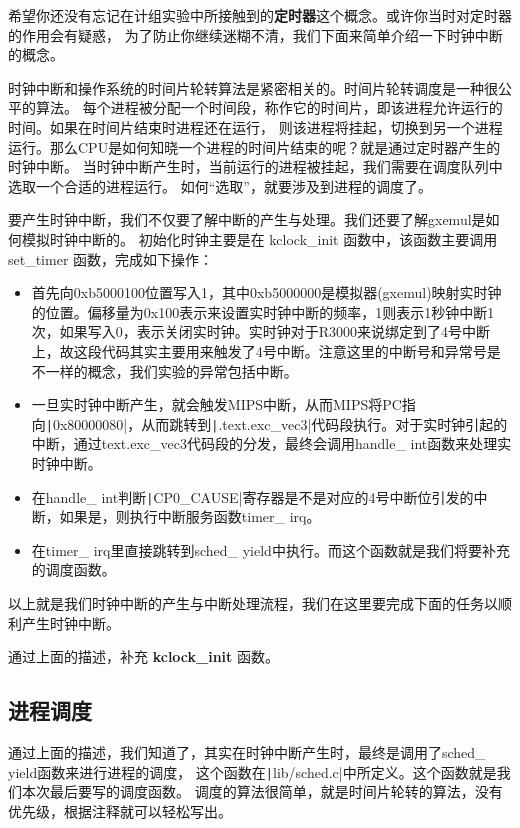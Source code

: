 希望你还没有忘记在计组实验中所接触到的\textbf{定时器}这个概念。或许你当时对定时器的作用会有疑惑，
为了防止你继续迷糊不清，我们下面来简单介绍一下时钟中断的概念。

时钟中断和操作系统的时间片轮转算法是紧密相关的。时间片轮转调度是一种很公平的算法。
每个进程被分配一个时间段，称作它的时间片，即该进程允许运行的时间。如果在时间片结束时进程还在运行，
则该进程将挂起，切换到另一个进程运行。那么CPU是如何知晓一个进程的时间片结束的呢？就是通过定时器产生的时钟中断。
当时钟中断产生时，当前运行的进程被挂起，我们需要在调度队列中选取一个合适的进程运行。
如何“选取”，就要涉及到进程的调度了。

要产生时钟中断，我们不仅要了解中断的产生与处理。我们还要了解gxemul是如何模拟时钟中断的。
初始化时钟主要是在 kclock\_init 函数中，该函数主要调用set\_timer 函数，完成如下操作：
\begin{itemize}
  \item 首先向0xb5000100位置写入1，其中0xb5000000是模拟器(gxemul)映射实时钟的位置。偏移量为0x100表示来设置实时钟中断的频率，1则表示1秒钟中断1次，如果写入0，表示关闭实时钟。实时钟对于R3000来说绑定到了4号中断上，故这段代码其实主要用来触发了4号中断。注意这里的中断号和异常号是不一样的概念，我们实验的异常包括中断。
  \item 一旦实时钟中断产生，就会触发MIPS中断，从而MIPS将PC指向\texttt|0x80000080|，从而跳转到\texttt|.text.exc_vec3|代码段执行。对于实时钟引起的中断，通过text.exc\_vec3代码段的分发，最终会调用handle\_ int函数来处理实时钟中断。
  \item 在handle\_ int判断\texttt|CP0_CAUSE|寄存器是不是对应的4号中断位引发的中断，如果是，则执行中断服务函数timer\_ irq。
  \item 在timer\_ irq里直接跳转到sched\_ yield中执行。而这个函数就是我们将要补充的调度函数。
\end{itemize}

以上就是我们时钟中断的产生与中断处理流程，我们在这里要完成下面的任务以顺利产生时钟中断。

\begin{exercise}
通过上面的描述，补充 \textbf{ kclock\_init } 函数。
\end{exercise}

\subsection{进程调度}

通过上面的描述，我们知道了，其实在时钟中断产生时，最终是调用了sched\_ yield函数来进行进程的调度，
这个函数在\texttt|lib/sched.c|中所定义。这个函数就是我们本次最后要写的调度函数。
调度的算法很简单，就是时间片轮转的算法，没有优先级，根据注释就可以轻松写出。

